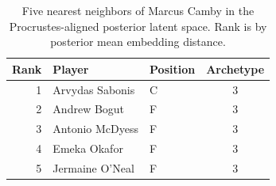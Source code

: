 \begin{table}[htbp]
  \centering\small
  \begin{tabular}{rllc}
    \toprule
    Rank & Player & Position & Archetype \\
    \midrule
    1 & Arvydas Sabonis & C & 3 \\
    2 & Andrew Bogut & F & 3 \\
    3 & Antonio McDyess & F & 3 \\
    4 & Emeka Okafor & F & 3 \\
    5 & Jermaine O'Neal & F & 3 \\
    \bottomrule
  \end{tabular}
  \caption{Five nearest neighbors of Marcus Camby in the Procrustes-aligned posterior latent space. Rank is by posterior mean embedding distance.}
  \label{tab:Marcus_Camby_neighbors}
\end{table}

